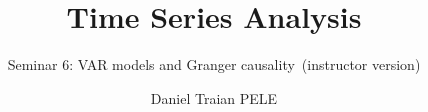 \title[Time Series Analysis]{Time Series Analysis}
\subtitle{Seminar 6: VAR models and Granger causality\ifsolutions\ (instructor version)\fi}
\author[D.T. Pele]{Daniel Traian PELE}
\date{}

\providecommand{\tsaapplink}[3]{\hypertarget{#2}{}\hyperlink{#1}{\beamergotobutton{#3}}}  %
\providecommand{\tsaappback}[2]{\begin{tikzpicture}[remember picture,overlay]\node[anchor=south east] at ([xshift=-3mm,yshift=7mm]current page.south east){\hyperlink{#1}{\beamerreturnbutton{#2}}};\end{tikzpicture}}  %
\providecommand{\tsachlink}[2]{\href{#1}{#2}}  %
\providecommand{\tsachlinkt}[2]{\href{#1}{\usebeamercolor[fg]{frametitle}#2}}  %


